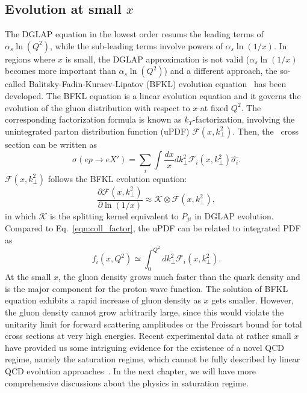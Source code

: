 \subsection{Evolution at small $x$}
The DGLAP equation in the lowest order resums the leading terms of
$\alpha_{s}\ln(Q^{2})$, while the sub-leading terms involve powers of
$\alpha_{s}\ln(1/x)$. In regions where $x$ is small, the DGLAP approximation is
not valid ($\alpha_{s}\ln(1/x)$ becomes more important than
$\alpha_{s}\ln(Q^{2})$) and a different approach, the so-called
Balitsky-Fadin-Kuraev-Lipatov (BFKL) evolution equation~\cite{Balitsky:1978ic}
has been developed. The BFKL equation is a linear evolution equation and it
governs the evolution of the gluon distribution with respect to $x$ at fixed
$Q^{2}$. The corresponding factorization formula is known as
$k_{T}$-factorization, involving the unintegrated parton distribution function
(uPDF) $\mathcal{F}(x,k^{2}_{\perp})$. Then, the \ep\ cross section can be written as
\begin{equation}
\sigma(ep\rightarrow eX')=\sum_{i} \int\frac{dx}{x}dk^{2}_{\perp}\mathcal{F}_{i}(x,k^{2}_{\perp})\hat{\sigma_{i}}.
\end{equation}
$\mathcal{F}(x,k^{2}_{\perp})$ follows the BFKL evolution equation:
\begin{equation}
\frac{\partial \mathcal{F}(x, k^{2}_{\perp})}{\partial \ln(1/x)}\approx \mathcal{K}\otimes \mathcal{F}(x, k^{2}_{\perp}),
\end{equation}
in which $\mathcal{K}$ is the splitting kernel equivalent to $P_{ji}$ in DGLAP evolution.
Compared to Eq.~\ref{eqn:coll_factor}, the uPDF can be related to integrated PDF
as \[f_{i}(x,Q^{2})\simeq \int^{Q^{2}}_{0}dk^{2}_{\perp}\mathcal{F}_{i}(x,k^{2}_{\perp}).\]
At the small $x$, the gluon density grows much faster than the quark density and
is the major component for the proton wave function. The solution of BFKL
equation exhibits a rapid increase of gluon density as $x$ gets smaller.
However, the gluon density cannot grow arbitrarily large, since this would
violate the unitarity limit for forward scattering amplitudes or the Froissart
bound for total cross sections at very high energies. Recent experimental data
at rather small $x$ have provided us some intriguing evidence for the existence
of a novel QCD regime, namely the saturation regime, which cannot be fully
described by linear QCD evolution
approaches~\cite{Stasto:2000er,Armesto:2004ud,Gelis:2010nm}. In the next
chapter, we will have more comprehensive discussions about the physics in
saturation regime.





